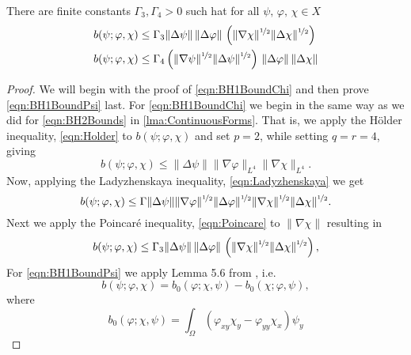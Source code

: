 \begin{lemma} \label{lma:BH1Bound}
  There are finite constants $\Gamma_3,\Gamma_4>0$ such hat for all
  $\psi,\, \varphi,\, \chi \in X$
  \begin{align}
    b(\psi;\varphi,\chi) &\le \Gamma_3 \|\Delta \psi\|\, \|\Delta \varphi\|\,
      \left(\|\nabla \chi\|^{\nicefrac{1}{2}}
      \|\Delta \chi\|^{\nicefrac{1}{2}}\right) \label{eqn:BH1BoundChi} \\
    b(\psi;\varphi,\chi) &\le \Gamma_4 \left(\|\nabla \psi\|^{\nicefrac{1}{2}}
      \|\Delta \psi\|^{\nicefrac{1}{2}}\right)\,
      \|\Delta \varphi\|\, \|\Delta \chi\| \label{eqn:BH1BoundPsi}
  \end{align}
\end{lemma}
\begin{proof}
  We will begin with the proof of \eqref{eqn:BH1BoundChi} and then prove \eqref{eqn:BH1BoundPsi} last. For \eqref{eqn:BH1BoundChi} we begin in the
  same way as we did for \autoref{eqn:BH2Bounds} in
  \autoref{lma:ContinuousForms}. That is, we apply the H\"older inequality, \eqref{eqn:Holder} to
  $b(\psi; \varphi, \chi)$ and set $p=2$, while setting $q=r=4$, giving
  \begin{equation*}
    b(\psi;\varphi,\chi) \le \|\Delta \psi\| \|\nabla \varphi\|_{L^4} \|\nabla
      \chi\|_{L^4}.
  \end{equation*}
  Now, applying the Ladyzhenskaya inequality, \eqref{eqn:Ladyzhenskaya} we get
  \begin{equation*}
    b(\psi;\varphi,\chi) \le \Gamma \|\Delta \psi\|
      \|\nabla \varphi\|^{\nicefrac{1}{2}} \|\Delta \varphi\|^{\nicefrac{1}{2}}
      \|\nabla \chi\|^{\nicefrac{1}{2}} \|\Delta \chi\|^{\nicefrac{1}{2}}.
  \end{equation*}
  Next we apply the Poincar\'e inequality, \eqref{eqn:Poincare} to $\|\nabla \chi\|$ resulting in
  \begin{equation*}
    b(\psi;\varphi,\chi) \le \Gamma_3 \|\Delta \psi\|\, \|\Delta \varphi\|\,
      \left(\|\nabla \chi\|^{\nicefrac{1}{2}}
      \|\Delta \chi\|^{\nicefrac{1}{2}}\right),
  \end{equation*}
  For \autoref{eqn:BH1BoundPsi} we apply Lemma 5.6 from \cite{Fairag98}, i.e.
  \begin{equation*}
    b(\psi; \varphi, \chi) = b_0(\varphi; \chi, \psi) - b_0(\chi; \varphi, \psi),
  \end{equation*}
  where
  \begin{equation}
    b_0(\varphi;\chi,\psi) = \int_{\Omega}\!
      (\varphi_{xy} \chi_y - \varphi_{yy} \chi_x) \psi_y

\end{equation}
\end{proof}
